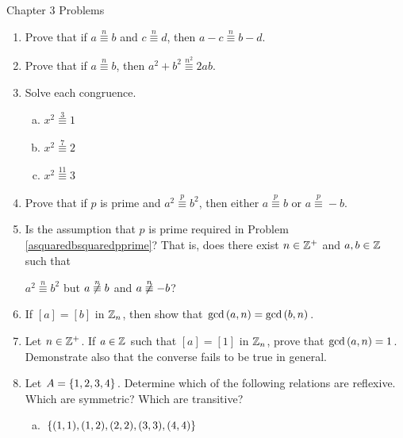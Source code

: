 \documentclass[11pt,fleqn,dvipsnames,usenames]{article}
\renewcommand{\headrulewidth}{1pt}
\begin{document}
\fancyhead[L]{\course}
\fancyhead[R]{\term}
\renewcommand{\headrulewidth}{0.4pt}

{\huge Chapter 3 Problems}
\vsp

\begin{enumerate}
\item Prove that if $a\overset{n}{\equiv}b$ and $c\overset{n}{\equiv}d$, then $a-c\overset{n}{\equiv}b-d$.
\item Prove that if $a\overset{n}{\equiv}b$, then $a^2 + b^2\overset{n^2}{\equiv}2ab$.
\item Solve each congruence.
\begin{multicols}{3}
\begin{enumerate}[(a)]
\item $x^2\overset{3}{\equiv}1$
\item $x^2\overset{7}{\equiv}2$
\item $x^2\overset{11}{\equiv}3$
\end{enumerate}
\end{multicols}
\item \label{asquaredbsquaredpprime}Prove that if $p$ is prime and $a^2\overset{p}{\equiv}b^2$, then either $a\overset{p}{\equiv}b$ or $a\overset{p}{\equiv}-b$.
\item Is the assumption that $p$ is prime required in Problem \ref{asquaredbsquaredpprime}?  That is, does there exist $n\in\mathbb{Z}^{+}$ and $a,b\in\mathbb{Z}$ such that
\begin{center}
$a^2\overset{n}{\equiv}b^2$ but $a\not\overset{n}{\equiv}b$ and $a\not\overset{n}{\equiv}-b$?
\end{center}
\item If $[a] = [b]$ in $\mathbb{Z}_{n}$, then show that $\text{gcd}\left(a,n\right) = \text{gcd}\left(b,n\right)$.
\item Let $n\in\mathbb{Z}^{+}$.  If $a\in \mathbb{Z}$ such that $[a] = [1]$ in $\mathbb{Z}_{n}$, prove that $\text{gcd}\left(a,n\right) = 1$.  Demonstrate also that the converse fails to be true in general.
\item Let $A = \left\{1,2,3,4\right\}$.  Determine which of the following relations are reflexive.  Which are symmetric?  Which are transitive?
\begin{enumerate}[(a)]
\item $\left\{(1,1), (1,2), (2,2), (3,3), (4,4)\right\}$

\end{enumerate}
\end{enumerate}
\end{document}

